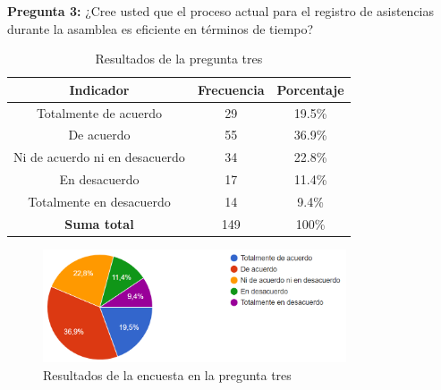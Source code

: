 \bigbreak
\textbf{Pregunta 3:} ¿Cree usted que el proceso actual para el registro de asistencias durante la asamblea es eficiente en términos de tiempo?
    \begin{table}[H]
        \centering
        \caption{Resultados de la pregunta tres}
        \begin{tabular}{|c|c|c|}
            \hline
            \textbf{Indicador} & \textbf{Frecuencia} &  \textbf{Porcentaje} \\
            \hline
            Totalmente de acuerdo & 29 & 19.5\% \\
            \hline
            De acuerdo & 55 & 36.9\% \\
            \hline
            Ni de acuerdo ni en desacuerdo & 34 & 22.8\% \\
            \hline
            En desacuerdo & 17 & 11.4\% \\
            \hline
            Totalmente en desacuerdo & 14 & 9.4\% \\
            \hline
            \textbf{Suma total} & 149 & 100\% \\
            \hline
        \end{tabular}\label{tab:table_preg_3}
    \end{table}
    \begin{figure}[H]
        \centering
        \includegraphics[width=0.8\textwidth]{resources/images/p3}
        \caption{Resultados de la encuesta en la pregunta tres}\label{fig:figure_p3}
    \end{figure}

